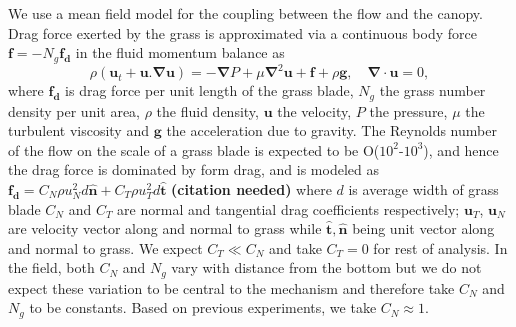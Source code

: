 \documentclass[aps,prl,reprint,twocolumn,showpacs,superscriptaddress,10pt]{revtex4-1}  %
\newcommand{\bn}{{\boldsymbol{\hat{n}}}}
\newcommand{\bt}{{\boldsymbol{\hat{t}}}}
\newcommand{\bu}{\mathbf{u}}
\newcommand{\grad}{\mathbf{\nabla}}
\newcommand{\shreyas}[1]{{\bf (#1)}}
\begin{document}
We use a mean field model for the coupling between the flow and the canopy. 
Drag force exerted by the grass is approximated via a continuous body force $\mathbf{f}=-N_g\mathbf{f_d}$ in the fluid momentum balance\cite{Vivoni98,Nepf99,Ghisal02,Delangre04,Delangre06} as
\begin{equation}
\rho \left(\bu_{t}+\bu.\grad\bu \right) = -\grad P+\mu\grad^{2}\bu +\mathbf{f}+\rho\mathbf{g}, \quad \grad\cdot\bu = 0,
\label{navier-stokes}
\end{equation}
where $\mathbf{f_{d}}$ is drag force per unit length of the grass blade, $N_g$ the grass number density per unit area, $\rho$ the fluid density, $\mathbf{u}$ the velocity, 
$P$ the pressure, $\mu$ the turbulent viscosity and $\mathbf{g}$ the acceleration due to gravity. 
The Reynolds number of the flow on the scale of a grass blade is expected to be O($10^2$-$10^3$), and hence the drag force is dominated by form drag, and is modeled as $\mathbf{f_{d}}=C_N \rho u_{N}^{2}d\bn + C_{T}\rho u_{T}^{2}d\bt$ \shreyas{citation needed} where $d$ is average width of grass blade $C_{N}$ and $C_{T}$ are normal and tangential drag coefficients respectively; $\bu_{T}$, $\bu_{N}$ are velocity vector along and
normal to grass while $\bt,\bn$ being unit vector along and normal to grass. 
We expect $C_T \ll C_N$ and take $C_T=0$ for rest of analysis. 
In the field, both $C_N$ and $N_g$ vary with distance from the bottom but we do not expect these variation to be central to the mechanism and therefore take $C_N$ and $N_g$ to be constants. 
Based on previous experiments\cite{Vivoni98}, we take $C_N \approx 1$.
\end{document}
